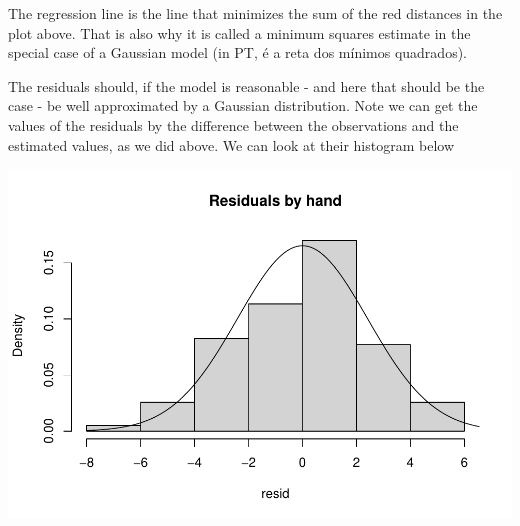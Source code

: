 \documentclass[
]{book}
\newenvironment{Shaded}{\begin{snugshade}}{\end{snugshade}}
\newcommand{\AttributeTok}[1]{\textcolor[rgb]{0.13,0.29,0.53}{#1}}
\newcommand{\CommentTok}[1]{\textcolor[rgb]{0.56,0.35,0.01}{\textit{#1}}}
\newcommand{\ConstantTok}[1]{\textcolor[rgb]{0.56,0.35,0.01}{#1}}
\newcommand{\DecValTok}[1]{\textcolor[rgb]{0.00,0.00,0.81}{#1}}
\newcommand{\FloatTok}[1]{\textcolor[rgb]{0.00,0.00,0.81}{#1}}
\newcommand{\FunctionTok}[1]{\textcolor[rgb]{0.13,0.29,0.53}{\textbf{#1}}}
\newcommand{\NormalTok}[1]{#1}
\newcommand{\SpecialCharTok}[1]{\textcolor[rgb]{0.81,0.36,0.00}{\textbf{#1}}}
\newcommand{\StringTok}[1]{\textcolor[rgb]{0.31,0.60,0.02}{#1}}
\begin{document}
The regression line is the line that minimizes the sum of the red distances in the plot above. That is also why it is called a minimum squares estimate in the special case of a Gaussian model (in PT, é a reta dos mínimos quadrados).

The residuals should, if the model is reasonable - and here that should be the case - be well approximated by a Gaussian distribution. Note we can get the values of the residuals by the difference between the observations and the estimated values, as we did above. We can look at their histogram below

\begin{Shaded}
\end{Shaded}

\includegraphics{ECOMODbook_files/figure-latex/a6.12-1.pdf}
\end{document}
